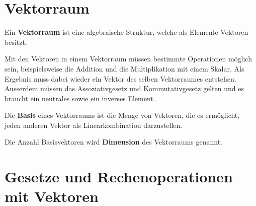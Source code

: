 \section{Vektorraum}
\begin{mydef}Ein \textbf{Vektorraum} ist eine algebraische Struktur, welche als Elemente Vektoren besitzt.\end{mydef}
Mit den Vektoren in einem Vektorraum müssen bestimmte Operationen möglich sein, beispielsweise die Addition und die Multiplikation mit einem Skalar. Als Ergebnis muss dabei wieder ein Vektor des selben Vektorraumes entstehen. Ausserdem müssen das Assoziativgesetz und Kommutativgesetz gelten und es braucht ein neutrales sowie ein inverses Element.
\begin{mydef}Die \textbf{Basis} eines Vektorraums ist die Menge von Vektoren, die es ermöglicht, jeden anderen Vektor als Linearkombination darzustellen.\end{mydef}
\begin{mydef}Die Anzahl Basisvektoren wird \textbf{Dimension} des Vektorraums genannt.\end{mydef}
\section{Gesetze und Rechenoperationen mit Vektoren}
